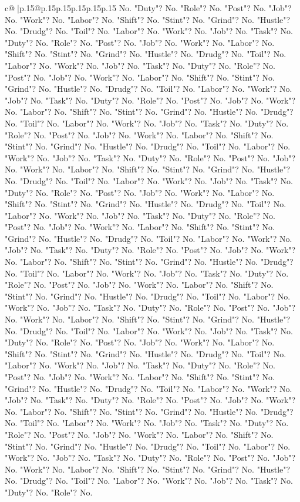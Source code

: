 \documentclass{article}
\begin{document}
{\begin{supertabular}{c@{$\;$}|p{.15\linewidth}@{}p{.15\linewidth}p{.15\linewidth}p{.15\linewidth}p{.15\linewidth}p{.15\linewidth}}
{{{No. "Duty"? No. "Role"? No. "Post"? No. "Job"? No. "Work"? No. "Labor"? No. "Shift"? No. "Stint"? No. "Grind"? No. "Hustle"? No. "Drudg"? No. "Toil"? No. "Labor"? No. "Work"? No. "Job"? No. "Task"? No. "Duty"? No. "Role"? No. "Post"? No. "Job"? No. "Work"? No. "Labor"? No. "Shift"? No. "Stint"? No. "Grind"? No. "Hustle"? No. "Drudg"? No. "Toil"? No. "Labor"? No. "Work"? No. "Job"? No. "Task"? No. "Duty"? No. "Role"? No. "Post"? No. "Job"? No. "Work"? No. "Labor"? No. "Shift"? No. "Stint"? No. "Grind"? No. "Hustle"? No. "Drudg"? No. "Toil"? No. "Labor"? No. "Work"? No. "Job"? No. "Task"? No. "Duty"? No. "Role"? No. "Post"? No. "Job"? No. "Work"? No. "Labor"? No. "Shift"? No. "Stint"? No. "Grind"? No. "Hustle"? No. "Drudg"? No. "Toil"? No. "Labor"? No. "Work"? No. "Job"? No. "Task"? No. "Duty"? No. "Role"? No. "Post"? No. "Job"? No. "Work"? No. "Labor"? No. "Shift"? No. "Stint"? No. "Grind"? No. "Hustle"? No. "Drudg"? No. "Toil"? No. "Labor"? No. "Work"? No. "Job"? No. "Task"? No. "Duty"? No. "Role"? No. "Post"? No. "Job"? No. "Work"? No. "Labor"? No. "Shift"? No. "Stint"? No. "Grind"? No. "Hustle"? No. "Drudg"? No. "Toil"? No. "Labor"? No. "Work"? No. "Job"? No. "Task"? No. "Duty"? No. "Role"? No. "Post"? No. "Job"? No. "Work"? No. "Labor"? No. "Shift"? No. "Stint"? No. "Grind"? No. "Hustle"? No. "Drudg"? No. "Toil"? No. "Labor"? No. "Work"? No. "Job"? No. "Task"? No. "Duty"? No. "Role"? No. "Post"? No. "Job"? No. "Work"? No. "Labor"? No. "Shift"? No. "Stint"? No. "Grind"? No. "Hustle"? No. "Drudg"? No. "Toil"? No. "Labor"? No. "Work"? No. "Job"? No. "Task"? No. "Duty"? No. "Role"? No. "Post"? No. "Job"? No. "Work"? No. "Labor"? No. "Shift"? No. "Stint"? No. "Grind"? No. "Hustle"? No. "Drudg"? No. "Toil"? No. "Labor"? No. "Work"? No. "Job"? No. "Task"? No. "Duty"? No. "Role"? No. "Post"? No. "Job"? No. "Work"? No. "Labor"? No. "Shift"? No. "Stint"? No. "Grind"? No. "Hustle"? No. "Drudg"? No. "Toil"? No. "Labor"? No. "Work"? No. "Job"? No. "Task"? No. "Duty"? No. "Role"? No. "Post"? No. "Job"? No. "Work"? No. "Labor"? No. "Shift"? No. "Stint"? No. "Grind"? No. "Hustle"? No. "Drudg"? No. "Toil"? No. "Labor"? No. "Work"? No. "Job"? No. "Task"? No. "Duty"? No. "Role"? No. "Post"? No. "Job"? No. "Work"? No. "Labor"? No. "Shift"? No. "Stint"? No. "Grind"? No. "Hustle"? No. "Drudg"? No. "Toil"? No. "Labor"? No. "Work"? No. "Job"? No. "Task"? No. "Duty"? No. "Role"? No. "Post"? No. "Job"? No. "Work"? No. "Labor"? No. "Shift"? No. "Stint"? No. "Grind"? No. "Hustle"? No. "Drudg"? No. "Toil"? No. "Labor"? No. "Work"? No. "Job"? No. "Task"? No. "Duty"? No. "Role"? No. "Post"? No. "Job"? No. "Work"? No. "Labor"? No. "Shift"? No. "Stint"? No. "Grind"? No. "Hustle"? No. "Drudg"? No. "Toil"? No. "Labor"? No. "Work"? No. "Job"? No. "Task"? No. "Duty"? No. "Role"? No. "Post"? No. "Job"? No. "Work"? No. "Labor"? No. "Shift"? No. "Stint"? No. "Grind"? No. "Hustle"? No. "Drudg"? No. "Toil"? No. "Labor"? No. "Work"? No. "Job"? No. "Task"? No. "Duty"? No. "Role"? No. "Post"? No. "Job"? No. "Work"? No. "Labor"? No. "Shift"? No. "Stint"? No. "Grind"? No. "Hustle"? No. "Drudg"? No. "Toil"? No. "Labor"? No. "Work"? No. "Job"? No. "Task"? No. "Duty"? No. "Role"? No. }}}
\end{supertabular}}
\end{document}
